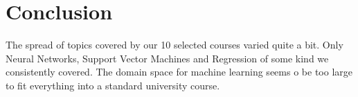 \documentclass[10pt,a4paper]{article}
\begin{document}
\section{Conclusion}

The spread of topics covered by our 10 selected courses varied quite a bit. Only Neural Networks, Support Vector Machines and Regression of some kind we consistently covered.
The domain space for machine learning seems o be too large to fit everything into a standard university course.


\end{document}
